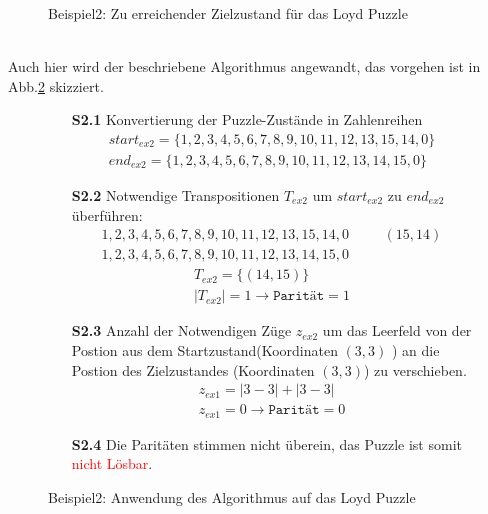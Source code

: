\begin{minipage}{\linewidth}
\begin{minipage}[t]{0.45\linewidth}
\begin{figure}[H]
			\captionsetup{format=plain, indention=0pt}
			\caption{\label{fig:Ex2_end}Beispiel2: Zu erreichender Zielzustand für das Loyd Puzzle}
		\end{figure}
	\end{minipage}
\end{minipage}\\\WNL%
Auch hier wird der beschriebene Algorithmus angewandt, das vorgehen ist in Abb.\ref{fig:Ex2_algo} skizziert.
\begin{figure}[H]
	\begin{enumerate}
		\item[\textbf{S2.1}] Konvertierung der Puzzle-Zustände in Zahlenreihen
		      \begin{align*}
			      start_{ex2} = \{1,2,3,4,5,6,7,8,9,10,11,12,13,15,14,0\} \\
			      end_{ex2} = \{1,2,3,4,5,6,7,8,9,10,11,12,13,14,15,0\}
		      \end{align*}
		\item[\textbf{S2.2}] Notwendige Transpositionen $T_{ex2}$ um $start_{ex2}$ zu $end_{ex2}$ überführen:
		      \begin{align*}
			      1,2,3,4,5,6,7,8,9,10,11,12,13,15,14,0 & \hspace{20pt} (15,14) \\
			      1,2,3,4,5,6,7,8,9,10,11,12,13,14,15,0 &
		      \end{align*}
		      \begin{align*}
			      T_{ex2} = \{(14,15)\} \\
			      \left\vert T_{ex2}\right\vert = 1 \rightarrow \texttt{Parität} = 1
		      \end{align*}
		\item[\textbf{S2.3}] Anzahl der Notwendigen Züge $z_{ex2}$ um das Leerfeld von der Postion aus dem Startzustand(Koordinaten $(3,3)$ ) an die Postion des Zielzustandes (Koordinaten $(3,3)$) zu verschieben.
		      \begin{align*}
			      z_{ex1} = \left | 3 - 3 \right | + \left | 3 - 3 \right | \\
			      z_{ex1} = 0 \rightarrow \texttt{Parität} = 0
		      \end{align*}
		\item[\textbf{S2.4}] Die Paritäten stimmen nicht überein, das Puzzle ist somit \textcolor{red}{nicht Lösbar}.
	\end{enumerate}
	\caption{Beispiel2: Anwendung des Algorithmus auf das Loyd Puzzle \label{fig:Ex2_algo}}
\end{figure}

